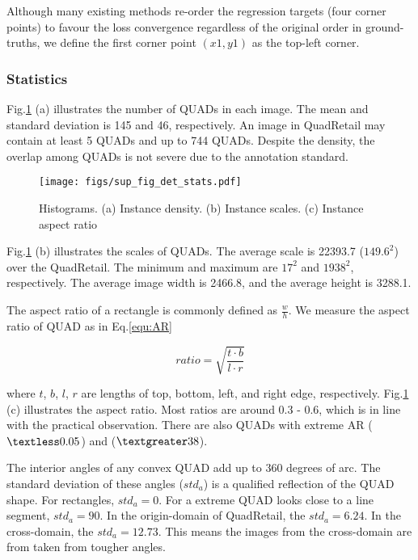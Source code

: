 \documentclass[runningheads]{llncs}
\begin{document}
Although many existing methods \cite{RIDet,RSDet,EAST} re-order the regression targets (four corner points) to favour the loss convergence regardless of the original order in ground-truths, we define the first corner point $(x1, y1)$ as the top-left corner.

\subsubsection{Statistics}
Fig.\ref{fig:sup_fig_det_stats} (a) illustrates the number of QUADs in each image. The mean and standard deviation is 145 and 46, respectively. An image in QuadRetail may contain at least 5 QUADs and up to 744 QUADs. Despite the density, the overlap among QUADs is not severe due to the annotation standard. 

\begin{figure}[t]
    \centering
    \texttt{[image: figs/sup\_fig\_det\_stats.pdf]}
    \caption{Histograms. (a) Instance density. (b) Instance scales. (c) Instance aspect ratio}
    \label{fig:sup_fig_det_stats}
\end{figure}

Fig.\ref{fig:sup_fig_det_stats} (b) illustrates the scales of QUADs. The average scale is 22393.7 ($149.6^2$) over the QuadRetail. The minimum and maximum are $17^2$ and $1938^2$, respectively. The average image width is 2466.8, and the average height is 3288.1. 

The aspect ratio of a rectangle is commonly defined as $\frac{w}{h}$. We measure the aspect ratio of QUAD as in Eq.\ref{equ:AR}

\begin{equation}
ratio = \sqrt{\frac{t \cdot b}{l \cdot r}}   
\label{equ:AR}
\end{equation}

\noindent where $t$, $b$, $l$, $r$ are lengths of top, bottom, left, and right edge, respectively. Fig.\ref{fig:sup_fig_det_stats} (c) illustrates the aspect ratio. Most ratios are around 0.3 - 0.6, which is in line with the practical observation. There are also QUADs with extreme AR ($\textless 0.05$) and ($\textgreater 38$).

The interior angles of any convex QUAD add up to 360 degrees of arc. The standard deviation of these angles ($std_a$) is a qualified reflection of the QUAD shape. For rectangles, $std_a = 0$. For a extreme QUAD looks close to a line segment, $std_a=90$. In the origin-domain of QuadRetail, the $std_a=6.24$. In the cross-domain, the $std_a=12.73$. This means the images from the cross-domain are from taken from tougher angles.
\end{document}
